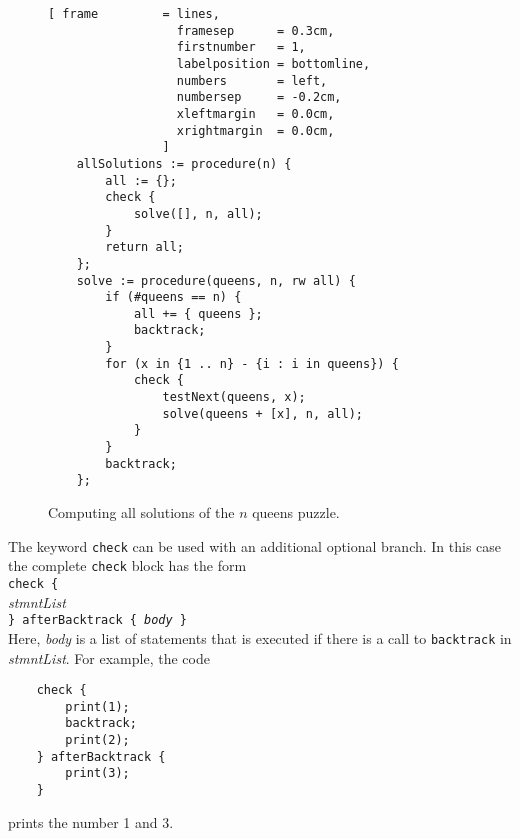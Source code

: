 \begin{figure}[!ht]
\centering
\begin{Verbatim}[ frame         = lines, 
                  framesep      = 0.3cm, 
                  firstnumber   = 1,
                  labelposition = bottomline,
                  numbers       = left,
                  numbersep     = -0.2cm,
                  xleftmargin   = 0.0cm,
                  xrightmargin  = 0.0cm,
                ]
    allSolutions := procedure(n) {
        all := {};
        check {
            solve([], n, all);
        }
        return all;
    };
    solve := procedure(queens, n, rw all) { 
        if (#queens == n) {
            all += { queens };
            backtrack;
        }
        for (x in {1 .. n} - {i : i in queens}) {
            check {
                testNext(queens, x);
                solve(queens + [x], n, all);
            } 
        }
        backtrack;
    };
 \end{Verbatim}
\vspace*{-0.3cm}
\caption{Computing all solutions of the $n$ queens puzzle.}
\label{fig:queens-all.stlx}
\end{figure}
\vspace*{0.3cm}

The keyword \texttt{check} can be used with an additional optional branch.  In this case the
complete \texttt{check} block has the form
\\[0.2cm]
\hspace*{1.3cm}
\texttt{check \{} 
\\
\hspace*{1.8cm}
\textsl{stmntList}
\\
\hspace*{1.3cm}
\texttt{\} afterBacktrack \{ \textsl{body} \}}
\\[0.2cm]
Here, \textsl{body} is a list of statements that is executed if there is a call to \texttt{backtrack} in
\textsl{stmntList}.  For example, the code
\begin{verbatim}
    check { 
        print(1); 
        backtrack; 
        print(2); 
    } afterBacktrack { 
        print(3); 
    }
\end{verbatim}
prints the number 1 and 3.

